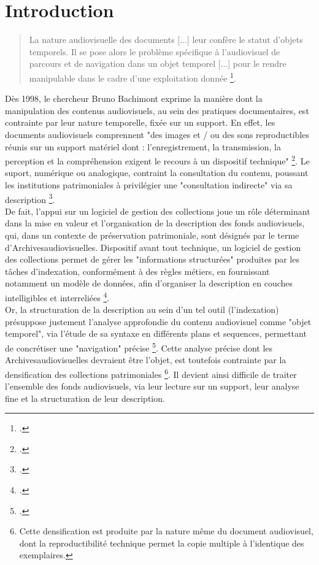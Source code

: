 \chapter*{Introduction}


\begin{quote}
	La nature audiovisuelle des documents [...] leur confère le statut d’objets temporels. Il se pose alors le problème spécifique à l’audiovisuel de parcours et de navigation dans un objet temporel [...] pour le rendre manipulable dans le cadre d’une exploitation donnée \footcite{bachimont1998}. 
\end{quote}

Dès 1998, le chercheur Bruno Bachimont exprime la manière dont la manipulation des contenus audiovisuels, au sein des pratiques documentaires, est contrainte par leur nature temporelle, fixée sur un support. En effet, les documents audiovisuels comprennent "des images et / ou des sons reproductibles réunis sur un support matériel dont : l’enregistrement, la transmission, la perception et la compréhension exigent le recours à un dispositif technique" \footcite{zotero-item-772}. Le suport, numérique ou analogique, contraint la consultation du contenu, poussant les institutions patrimoniales à privilégier une "consultation indirecte" via sa description \footcite{bachimont1998}. \\
De fait, l'appui sur un logiciel de gestion des collections joue un rôle déterminant dans la mise en valeur et l'organisation de la description des fonds audiovisuels, qui, dans un contexte de préservation patrimoniale, sont désignés par le terme d'\gls{Archivesaudiovisuelles}. Dispositif avant tout technique, un logiciel de gestion des collections permet de gérer les "informations structurées" produites par les tâches d'indexation, conformément à des règles métiers, en fournissant notamment un modèle de données, afin d'organiser la description en couches intelligibles et interreliées \footcite{zotero-item-766}. \\
Or, la structuration de la description  au sein d'un tel outil (l'indexation) présuppose justement l'analyse approfondie du contenu audiovisuel comme "objet temporel", via l'étude de sa syntaxe en différents \gls{plan}s et \gls{sequence}s, permettant de concrétiser une "navigation" précise \footcite{bachimont1998}. Cette analyse précise dont les \gls{Archivesaudiovisuelles} devraient être l'objet, est toutefois contrainte par la densification des collections patrimoniales \footnote{Cette densification est produite par la nature même du document audiovisuel, dont la reproductibilité technique permet la copie multiple à l'identique des exemplaires.}. Il devient ainsi difficile de traiter l'ensemble des fonds audiovisuels, via leur lecture sur un support, leur analyse fine et la structuration de leur description. 
